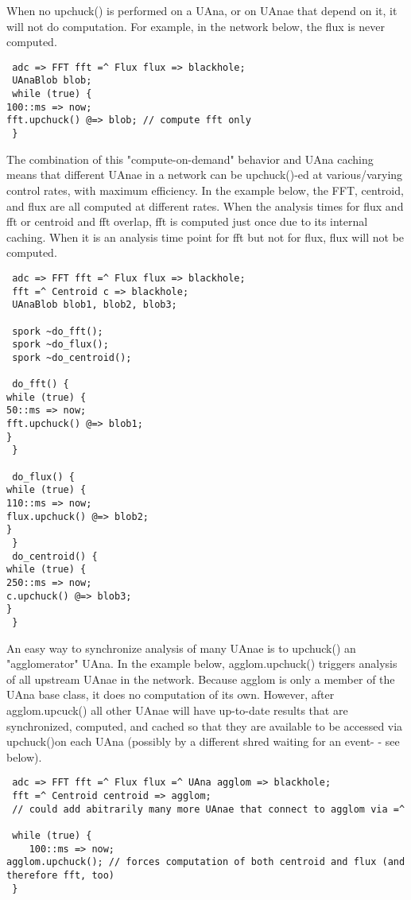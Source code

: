 When no upchuck() is performed on a UAna, or on UAnae that depend on it, it
will not do computation. For example, in the network below, the flux is never
computed.

\begin{verbatim}
 adc => FFT fft =^ Flux flux => blackhole;
 UAnaBlob blob;
 while (true) {
100::ms => now;
fft.upchuck() @=> blob; // compute fft only
 }
\end{verbatim}

The combination of  this "compute-on-demand" behavior and UAna caching means
that different UAnae in a network can be upchuck()-ed at various/varying
control rates, with maximum efficiency. In the example below, the FFT,
centroid, and flux are all computed at different rates. When the analysis times
for flux and fft or centroid and fft overlap, fft is computed just once due to
its internal caching. When it is an analysis time point for fft but not
for flux, flux will not be computed.

\begin{verbatim}
 adc => FFT fft =^ Flux flux => blackhole;
 fft =^ Centroid c => blackhole;
 UAnaBlob blob1, blob2, blob3;

 spork ~do_fft();
 spork ~do_flux();
 spork ~do_centroid();

 do_fft() {
while (true) {
50::ms => now;
fft.upchuck() @=> blob1;
}
 }

 do_flux() {
while (true) {
110::ms => now;
flux.upchuck() @=> blob2;
}
 }
 do_centroid() {
while (true) {
250::ms => now;
c.upchuck() @=> blob3;
}
 }
\end{verbatim}

An easy way to synchronize analysis of many UAnae is to upchuck() an
"agglomerator" UAna. In the example below, agglom.upchuck() triggers analysis
of all upstream UAnae in the network. Because agglom is only a member of
the UAna base class, it does no computation of its own. However,
after agglom.upcuck() all other UAnae will have up-to-date results that are
synchronized, computed, and cached so that they are available to be accessed
via upchuck()on each UAna (possibly by a different shred waiting for an event-
- see below).

\begin{verbatim}
 adc => FFT fft =^ Flux flux =^ UAna agglom => blackhole;
 fft =^ Centroid centroid => agglom;
 // could add abitrarily many more UAnae that connect to agglom via =^

 while (true) {
 	100::ms => now;
agglom.upchuck(); // forces computation of both centroid and flux (and
therefore fft, too)
 }
\end{verbatim}

